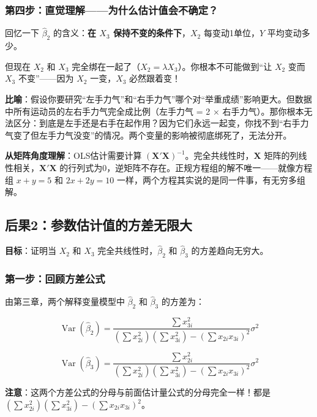 \documentclass[12pt,a4paper]{ctexart}
\newcommand{\Var}{\operatorname{Var}}
\begin{document}
\subsubsection{第四步：直觉理解——为什么估计值会不确定？}

回忆一下 $\hat{\beta}_2$ 的含义：\textbf{在 $X_3$ 保持不变的条件下}，$X_2$ 每变动1单位，$Y$ 平均变动多少。

但现在 $X_2$ 和 $X_3$ 完全绑在一起了（$X_2 = \lambda X_3$）。你根本不可能做到“让 $X_2$ 变而 $X_3$ 不变”——因为 $X_2$ 一变，$X_3$ 必然跟着变！

\textbf{比喻}：假设你要研究“左手力气”和“右手力气”哪个对“举重成绩”影响更大。但数据中所有运动员的左右手力气完全成比例（左手力气 = 2 × 右手力气）。那你根本无法区分：到底是左手还是右手在起作用？因为它们永远一起变，你找不到“右手力气变了但左手力气没变”的情况。两个变量的影响被彻底绑死了，无法分开。

\textbf{从矩阵角度理解}：OLS估计需要计算 $(\mathbf{X}'\mathbf{X})^{-1}$。完全共线性时，$\mathbf{X}$ 矩阵的列线性相关，$\mathbf{X}'\mathbf{X}$ 的行列式为0，逆矩阵不存在。正规方程组的解不唯一——就像方程组 $x + y = 5$ 和 $2x + 2y = 10$ 一样，两个方程其实说的是同一件事，有无穷多组解。

\subsection{后果2：参数估计值的方差无限大}

\textbf{目标}：证明当 $X_2$ 和 $X_3$ 完全共线性时，$\hat{\beta}_2$ 和 $\hat{\beta}_3$ 的方差趋向无穷大。

\subsubsection{第一步：回顾方差公式}

由第三章，两个解释变量模型中 $\hat{\beta}_2$ 和 $\hat{\beta}_3$ 的方差为：

\begin{equation}
\Var(\hat{\beta}_2) = \frac{\sum x_{3i}^2}{(\sum x_{2i}^2)(\sum x_{3i}^2) - (\sum x_{2i} x_{3i})^2} \sigma^2 \tag{4.9}
\end{equation}

\begin{equation}
\Var(\hat{\beta}_3) = \frac{\sum x_{2i}^2}{(\sum x_{2i}^2)(\sum x_{3i}^2) - (\sum x_{2i} x_{3i})^2} \sigma^2 \tag{4.10}
\end{equation}

\textbf{注意}：这两个方差公式的分母与前面估计量公式的分母完全一样！都是 $(\sum x_{2i}^2)(\sum x_{3i}^2) - (\sum x_{2i} x_{3i})^2$。
\end{document}
